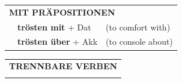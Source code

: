 \documentclass[10pt,a4paper]{revtex4-2}
\begin{document}
\begin{verbbox}
\vspace{10pt}

\begin{tabular}{lll}
\multicolumn{3}{l}{\textbf{MIT PRÄPOSITIONEN}}\\
& \textbf{trösten mit} + Dat & (to comfort with)\\
& \textbf{trösten über} + Akk & (to console about)\\
\end{tabular}
\hfill
\begin{tabular}{lll}
\multicolumn{3}{l}{\textbf{TRENNBARE VERBEN}}\\
\vspace{20pt}
\end{tabular}
\vspace{-5pt}
\end{verbbox}
\end{document}

